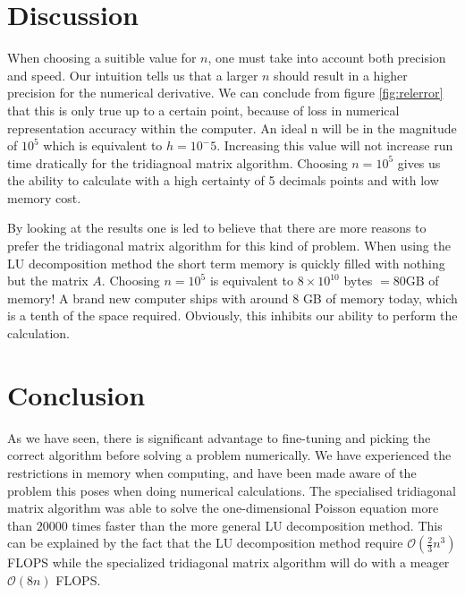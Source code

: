 \documentclass[10pt, a4paper]{amsart}
\begin{document}
\section{Discussion}
When choosing a suitible value for $n$, one must take into account both precision and speed. Our intuition tells us that a larger $n$ should result in a higher precision for the numerical derivative. We can conclude from figure \ref{fig:relerror} that this is only true up to a certain point, because of loss in numerical representation accuracy within the computer. An ideal n will be in the magnitude of $10^5$ which is equivalent to $h=10^-5$. Increasing this value will not increase run time dratically for the tridiagnoal matrix algorithm. Choosing $n=10^5$ gives us the ability to calculate with a high certainty of 5 decimals points and with low memory cost. 

By looking at the results one is led to believe that there are more reasons to prefer the tridiagonal matrix algorithm for this kind of problem. When using the LU decomposition method the short term memory is quickly filled with nothing but the matrix $A$. Choosing $n=10^5$ is equivalent to $8\times10^{10}$ bytes $=80$GB of memory! A brand new computer ships with around $8$ GB of memory today, which is a tenth of the space required. Obviously, this inhibits our ability to perform the calculation. 

\section{Conclusion}
As we have seen, there is significant advantage to fine-tuning and picking the correct algorithm before solving a problem numerically. We have experienced the restrictions in memory when computing, and have been made aware of the problem this poses when doing numerical calculations. The specialised tridiagonal matrix algorithm was able to solve the one-dimensional Poisson equation more than $20000$ times faster than the more general LU decomposition method. This can be explained by the fact that the LU decomposition method require $\mathcal{O}(\frac{2}{3}n^3)$ FLOPS while the specialized tridiagonal matrix algorithm will do with a meager $\mathcal{O}(8n)$ FLOPS.

\begin{thebibliography}{10}
\end{thebibliography}
\end{document}
